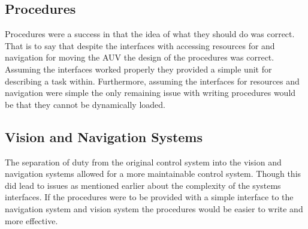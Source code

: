\subsection{Procedures}

Procedures were a success in that the idea of what they should do was correct.
That is to say that despite the interfaces with accessing resources for and
navigation for moving the AUV the design of the procedures was correct.
Assuming the interfaces worked properly they provided a simple unit for
describing a task within.
Furthermore, assuming the interfaces for resources and navigation were simple
the only remaining issue with writing procedures would be that they cannot be
dynamically loaded.

\subsection{Vision and Navigation Systems}

The separation of duty from the original control system into the vision and
navigation systems allowed for a more maintainable control system.
Though this did lead to issues as mentioned earlier about the complexity of
the systems interfaces.
If the procedures were to be provided with a simple interface to the navigation
system and vision system the procedures would be easier to write and more
effective.
